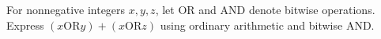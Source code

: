 For nonnegative integers $ x,y,z $, let $\mathbin{\mathrm{OR}}$ and $\mathbin{\mathrm{AND}}$ denote bitwise operations. Express $(x\mathbin{\mathrm{OR}}y)+(x\mathbin{\mathrm{OR}}z)$ using ordinary arithmetic and bitwise AND.
